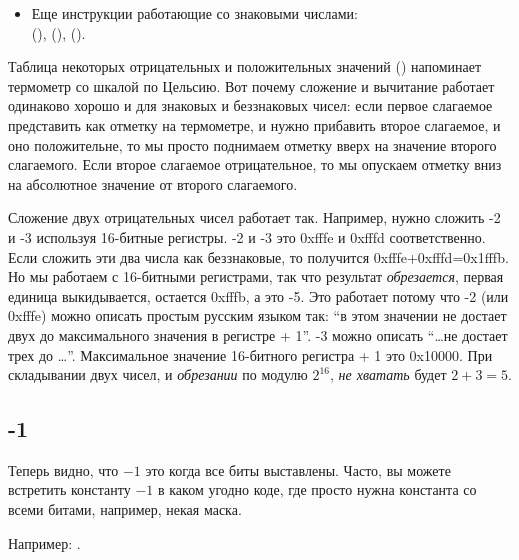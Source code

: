 \begin{itemize}
\item Еще инструкции работающие со знаковыми числами:\\
	 (),  (),  ().
\end{itemize}

Таблица некоторых отрицательных и положительных значений () напоминает термометр со шкалой по Цельсию.
Вот почему сложение и вычитание работает одинаково хорошо и для знаковых и беззнаковых чисел:
если первое слагаемое представить как отметку на термометре, и нужно прибавить второе слагаемое,
и оно положительне, то мы просто поднимаем отметку вверх на значение второго слагаемого.
Если второе слагаемое отрицательное, то мы опускаем отметку вниз на абсолютное значение от второго слагаемого.

Сложение двух отрицательных чисел работает так.
Например, нужно сложить -2 и -3 используя 16-битные регистры.
-2 и -3 это 0xfffe и 0xfffd соответственно.
Если сложить эти два числа как беззнаковые, то получится 0xfffe+0xfffd=0x1fffb.
Но мы работаем с 16-битными регистрами, так что результат \emph{обрезается}, первая единица выкидывается,
остается 0xfffb, а это -5.
Это работает потому что -2 (или 0xfffe) можно описать простым русским языком так:
``в этом значении не достает двух до максимального значения в регистре + 1''.
-3 можно описать ``\dots не достает трех до \dots''.
Максимальное значение 16-битного регистра + 1 это 0x10000.
При складывании двух чисел, и \emph{обрезании} по модулю $2^{16}$, \emph{не хватать} будет $2+3=5$.




\subsection{-1}

Теперь видно, что $-1$ это когда все биты выставлены.
Часто, вы можете встретить константу $-1$ в каком угодно коде, где просто нужна константа со всеми битами, например, некая маска.

Например: .

